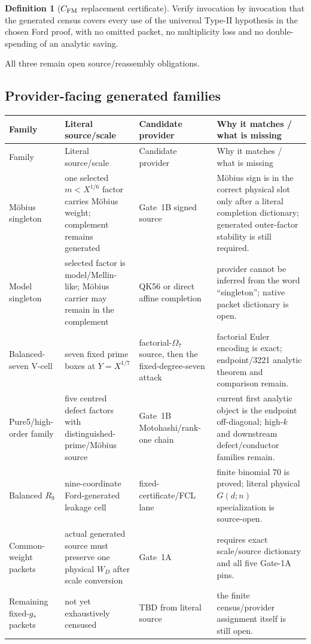 \documentclass[11pt]{article}
\theoremstyle{definition}
\newtheorem{definition}[theorem]{Definition}
\newcommand{\1}{\mathbf 1}
\begin{document}
\begin{definition}[$C_{\rm FM}$ replacement certificate]
Verify invocation by invocation that the generated census covers every use of the universal
Type-II hypothesis in the chosen Ford proof, with no omitted packet, no multiplicity loss
and no double-spending of an analytic saving.
\end{definition}

All three remain open source/reassembly obligations.

\subsection{Provider-facing generated families}

\begin{longtable}{p{}p{}p{}p{}}
\toprule
Family & Literal source/scale & Candidate provider & Why it matches / what is missing\\
\midrule
\endfirsthead
\toprule
Family & Literal source/scale & Candidate provider & Why it matches / what is missing\\
\midrule
\endhead
M\"obius singleton &
one selected $m<X^{1/6}$ factor carries M\"obius weight; complement remains generated &
Gate~1B signed source &
M\"obius sign is in the correct physical slot only after a literal completion dictionary;
generated outer-factor stability is still required.\\
Model singleton &
selected factor is model/Mellin-like; M\"obius carrier may remain in the complement &
QK56 or direct affine completion &
provider cannot be inferred from the word ``singleton''; native packet dictionary is open.\\
Balanced-seven V-cell &
seven fixed prime boxes at $Y=X^{1/7}$ &
factorial-$\Omega_7$ source, then the fixed-degree-seven attack &
factorial Euler encoding is exact; endpoint/3221 analytic theorem and comparison remain.\\
Pure5/high-order family &
five centred defect factors with distinguished-prime/M\"obius source &
Gate~1B Motohashi/rank-one chain &
current first analytic object is the endpoint off-diagonal; high-$k$ and downstream
defect/conductor families remain.\\
Balanced $R_9$ &
nine-coordinate Ford-generated leakage cell &
fixed-certificate/FCL lane &
finite binomial $70$ is proved; literal physical $G(d;n)$ specialization is source-open.\\
Common-weight packets &
actual generated source must preserve one physical $W_D$ after scale conversion &
Gate~1A &
requires exact scale/source dictionary and all five Gate-1A pins.\\
Remaining fixed-$g_\ast$ packets &
not yet exhaustively censused &
TBD from literal source &
the finite census/provider assignment itself is still open.\\
\bottomrule
\end{longtable}
\end{document}
